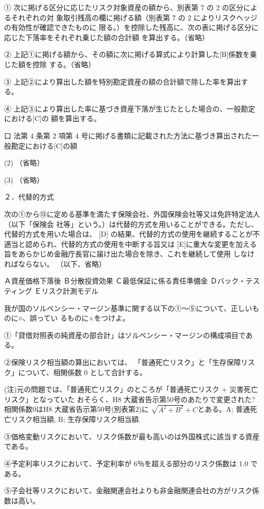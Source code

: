 \documentclass[report,gutter=10mm,fore-edge=10mm,uplatex,dvipdfmx]{jlreq}
\begin{document}
① 次に掲げる区分に応じたリスク対象資産の額から、別表第 7 の 2 の区分によるそれぞれの対
象取引残高の欄に掲げる額（別表第 7 の 2 によりリスクヘッジの有効性が確認できたものに
限る。）を控除した残高に、次の表に掲げる区分に応じた下落率をそれぞれ乗じた額の合計額
を算出する。（省略）

② 上記①に掲げる額から、その額に次に掲げる算式により計算した[B]係数を乗じた額を控除
する。（省略）

③ 上記②により算出した額を特別勘定資産の額の合計額で除した率を算出する。

④ 上記③により算出した率に基づき資産下落が生じたとした場合の、一般勘定における[C]の
額を算出する。

口 法第 4 条第 2 項第 4 号に掲げる書類に記載された方法に基づき算出された一般勘定における[C]の額

(2) （省略）

(3) （省略）

２．代替的方式

次の①から⑬に定める基準を満たす保険会社、外国保険会社等又は免許特定法人（以下「保険会
社等」という。）は代替的方式を用いることができる。ただし、代替的方式を用いた場合は、 [D]
の結果、代替的方式の使用を継続することが不適当と認められ、代替的方式の使用を中断する旨又は
[E]に重大な変更を加える旨をあらかじめ金融庁長官に届け出た場合を除き、これを継続して使用
しなければならない。
（以下、省略）

\answer{}
Ａ資産価格下落後
Ｂ分散投資効果
Ｃ最低保証に係る責任準備金
Ｄバック・テスティング
Ｅリスク計測モデル

我が国のソルベンシー・マージン基準に関する以下の①～⑤について、正しいものに○、誤ってい
るものに×をつけよ。

①「貸借対照表の純資産の部合計」はソルベンシー・マージンの構成項目である。

②保険リスク相当額の算出においては、
「普通死亡リスク」と「生存保障リスク」について、相関係数 0 として合計する。

(注)元の問題では、「普通死亡リスク」のところが「普通死亡リスク + 災害死亡リスク」となっていた
おそらく、H8 大蔵省告示第50号のあたりで変更された?
相関係数0はH8 大蔵省告示第50号(別表第2)に $\sqrt{A^2+B^2}+C$とある。A; 普通死亡リスク相当額, B; 生存保障リスク相当額.

③価格変動リスクにおいて、リスク係数が最も高いのは外国株式に該当する資産である。

④予定利率リスクにおいて、予定利率が 6％を超える部分のリスク係数は 1.0 である。

⑤子会社等リスクにおいて、金融関連会社よりも非金融関連会社の方がリスク係数は高い。
\end{document}
